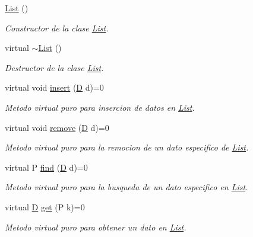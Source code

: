 \begin{DoxyCompactItemize}
\item 
\hyperlink{class_list_a3deb54ab4f51c6c39aa4015f258b5812}{List} ()
\begin{DoxyCompactList}\small\item\em Constructor de la clase \hyperlink{class_list}{List}. \end{DoxyCompactList}\item 
virtual \hyperlink{class_list_a624593fb77847bf7ad4cacfba3442471}{$\sim$\+List} ()
\begin{DoxyCompactList}\small\item\em Destructor de la clase \hyperlink{class_list}{List}. \end{DoxyCompactList}\item 
virtual void \hyperlink{class_list_a01f588d87d47f8332928eca38f7b11bb}{insert} (\hyperlink{main_8cpp_af316c33cc298530f245e8b55330e86b5}{D} d)=0
\begin{DoxyCompactList}\small\item\em Metodo virtual puro para insercion de datos en \hyperlink{class_list}{List}. \end{DoxyCompactList}\item 
virtual void \hyperlink{class_list_a14fc4e853102018df78db3899aa00d71}{remove} (\hyperlink{main_8cpp_af316c33cc298530f245e8b55330e86b5}{D} d)=0
\begin{DoxyCompactList}\small\item\em Metodo virtual puro para la remocion de un dato especifico de \hyperlink{class_list}{List}. \end{DoxyCompactList}\item 
virtual P \hyperlink{class_list_a2b40d6fffc7b2fb5138b648f52c839ee}{find} (\hyperlink{main_8cpp_af316c33cc298530f245e8b55330e86b5}{D} d)=0
\begin{DoxyCompactList}\small\item\em Metodo virtual puro para la busqueda de un dato especifico en \hyperlink{class_list}{List}. \end{DoxyCompactList}\item 
virtual \hyperlink{main_8cpp_af316c33cc298530f245e8b55330e86b5}{D} \hyperlink{class_list_a5bd565e668247ae0691983227367cc88}{get} (P k)=0
\begin{DoxyCompactList}\small\item\em Metodo virtual puro para obtener un dato en \hyperlink{class_list}{List}. \end{DoxyCompactList}\item 

\end{DoxyCompactItemize}
